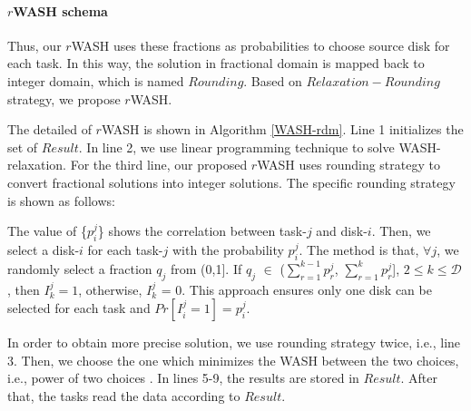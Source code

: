 \documentclass[conference]{IEEEtran}
\begin{document}
 \paragraph{\textbf{$r$WASH schema}} 

Thus, our $r$WASH uses these fractions as probabilities to choose source disk for each task. In this way, the solution in fractional domain is mapped back to integer domain, which is named $Rounding$. 
Based on $Relaxation-Rounding$ strategy, we propose $r$WASH. 

The detailed of $r$WASH is shown in Algorithm \ref{WASH-rdm}. Line 1 initializes the set of $Result$. In line 2, we use linear programming technique to solve WASH-relaxation. For the third line, our proposed $r$WASH uses rounding strategy to convert fractional solutions into integer solutions. The specific rounding strategy is shown as follows:
 
The value of \{$p_i^j$\}  shows the correlation between task-$j$ and disk-$i$. Then, we select a disk-$i$ for each task-$j$ with the probability $p_i^j$. The method is that, $\forall j$, we randomly select a fraction $q_j$ from (0,1]. If $q_j$ $\in$ ($\sum\nolimits_{r = 1}^{k-1} p_{r}^{j}$,  $\sum\nolimits_{r = 1}^{k} p_{r}^{j}$], $2 \leq k \leq \mathcal{D} $, then $I_k^j = 1$, otherwise, $I_k^j$ = 0. This approach ensures only one disk can be selected for each task and $Pr[I_i^j = 1] = p_i^j$.

In order to obtain more precise solution, we use rounding strategy twice, i.e., line 3. Then, we choose the one which minimizes the WASH between the two choices, i.e., power of two choices \cite{b43}. In lines 5-9, the results are stored in $Result$. After that, the tasks read the data according to $Result$. 
\end{document}
